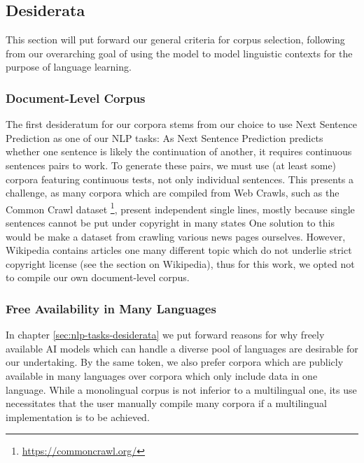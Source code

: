 \subsection{Desiderata}


This section will put forward our general criteria for corpus selection, following from our overarching goal of using the model to model linguistic contexts for the purpose of language learning.


\subsubsection{Document-Level Corpus}
The first desideratum for our corpora stems from our choice to use Next Sentence Prediction as one of our NLP tasks:
As Next Sentence Prediction predicts whether one sentence is likely the continuation of another, it requires continuous sentences pairs to work.
To generate these pairs, we must use (at least some) corpora featuring continuous tests, not only individual sentences.
This presents a challenge, as many corpora which are compiled from Web Crawls, such as the Common Crawl dataset \footnote{\url{https://commoncrawl.org/}}, present independent single lines, mostly because single sentences cannot be put under copyright in many states 
One solution to this would be make a dataset from crawling various news pages ourselves.
However, Wikipedia contains articles one many different topic which do not underlie strict copyright license (see the section on Wikipedia), thus for this work, we opted not to compile our own document-level corpus.

\subsubsection{Free Availability in Many Languages}
In chapter \ref{sec:nlp-tasks-desiderata} we put forward reasons for why freely available AI models which can handle a diverse pool of languages are desirable for our undertaking.
By the same token, we also prefer corpora which are publicly available in many languages over corpora which only include data in one language.
While a monolingual corpus is not inferior to a multilingual one, its use necessitates that the user manually compile many corpora if a multilingual implementation is to be achieved.

